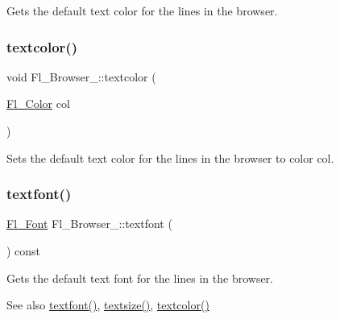 Gets the default text color for the lines in the browser. \mbox{\label{class_fl___browser___ad33ff1165743695e7bb2e1d89eb75622}} 
\subsubsection{\texorpdfstring{textcolor()}{textcolor()}\hspace{0.1cm}{\footnotesize\ttfamily [2/2]}}
{\footnotesize\ttfamily void Fl\+\_\+\+Browser\+\_\+\+::textcolor (\begin{DoxyParamCaption}\item[{\hyperlink{_enumerations_8_h_a8b762953646f8abee866061f1af78a6a}{Fl\+\_\+\+Color}}]{col }\end{DoxyParamCaption})\hspace{0.3cm}{\ttfamily [inline]}}

Sets the default text color for the lines in the browser to color {\ttfamily col}. \mbox{\label{class_fl___browser___a2963aa5fdbdba4f300a6ae328e31dd13}} 
\subsubsection{\texorpdfstring{textfont()}{textfont()}\hspace{0.1cm}{\footnotesize\ttfamily [1/2]}}
{\footnotesize\ttfamily \hyperlink{_enumerations_8_h_a2ac46d9f082834b969fffe490a03a709}{Fl\+\_\+\+Font} Fl\+\_\+\+Browser\+\_\+\+::textfont (\begin{DoxyParamCaption}{ }\end{DoxyParamCaption}) const\hspace{0.3cm}{\ttfamily [inline]}}

Gets the default text font for the lines in the browser. \begin{DoxySeeAlso}{See also}
\hyperlink{class_fl___browser___a2963aa5fdbdba4f300a6ae328e31dd13}{textfont()}, \hyperlink{class_fl___browser___a43889aa554fd2285991f73cc11918bda}{textsize()}, \hyperlink{class_fl___browser___a1a76a8e81183b02b45a669d8cfd3adeb}{textcolor()} 
\end{DoxySeeAlso}
\mbox{\label{class_fl___browser___aea733233102940a15e5f31b9e3ba3ec9}} 
